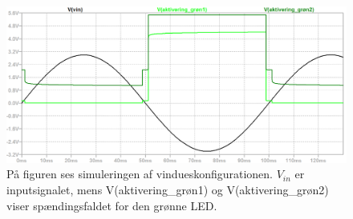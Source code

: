 \begin{figure}[H]
	\centering
	\includegraphics[scale=0.36]{figures/cProblemloesning/vindues_konfiguration.PNG}
	\caption{På figuren ses simuleringen af vindueskonfigurationen. $V_{in}$ er inputsignalet, mens V(aktivering_grøn1) og V(aktivering_grøn2) viser spændingsfaldet for den grønne LED.}
	\label{fig:vindues_konfiguration}
\end{figure}

